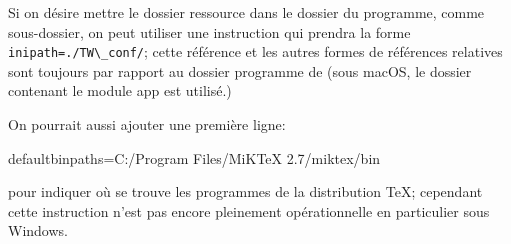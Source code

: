 Si on désire mettre le dossier ressource dans le dossier du programme, comme sous-dossier, on peut utiliser une instruction qui prendra la forme \verb|inipath=./TW\_conf/|; cette référence et les autres formes de références relatives sont toujours par rapport au dossier programme de \Tw (sous macOS, le dossier contenant le module app est utilisé.)

On pourrait aussi ajouter une première ligne:
\begin{verbExample}
defaultbinpaths=C:/Program Files/MiKTeX 2.7/miktex/bin
\end{verbExample}
pour indiquer où se trouve les programmes de la distribution \TeX; cependant cette instruction n'est pas encore pleinement opérationnelle en particulier sous Windows.

